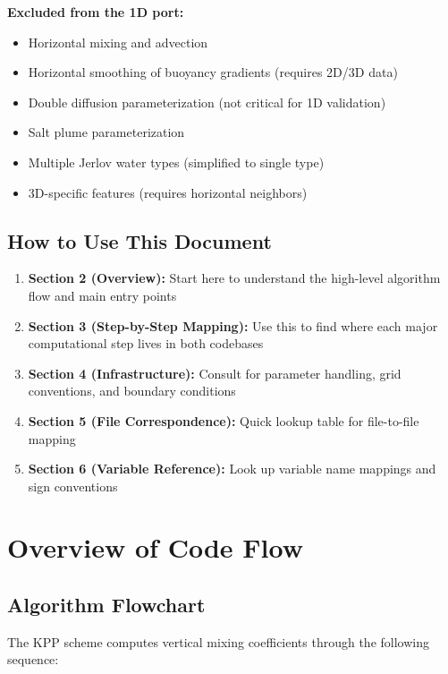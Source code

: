 \documentclass[11pt]{article}
\begin{document}
\textbf{Excluded from the 1D port:}
\begin{itemize}
    \item Horizontal mixing and advection
    \item Horizontal smoothing of buoyancy gradients (requires 2D/3D data)
    \item Double diffusion parameterization (not critical for 1D validation)
    \item Salt plume parameterization
    \item Multiple Jerlov water types (simplified to single type)
    \item 3D-specific features (requires horizontal neighbors)
\end{itemize}

\subsection{How to Use This Document}

\begin{enumerate}
    \item \textbf{Section 2 (Overview):} Start here to understand the high-level algorithm flow and main entry points
    \item \textbf{Section 3 (Step-by-Step Mapping):} Use this to find where each major computational step lives in both codebases
    \item \textbf{Section 4 (Infrastructure):} Consult for parameter handling, grid conventions, and boundary conditions
    \item \textbf{Section 5 (File Correspondence):} Quick lookup table for file-to-file mapping
    \item \textbf{Section 6 (Variable Reference):} Look up variable name mappings and sign conventions
\end{enumerate}

\section{Overview of Code Flow}
\label{sec:overview}

\subsection{Algorithm Flowchart}

The KPP scheme computes vertical mixing coefficients through the following sequence:
\end{document}
